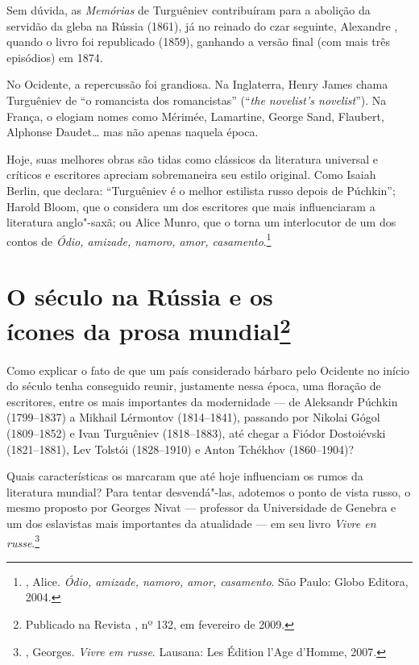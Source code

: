 Sem dúvida, as \emph{Memórias} de Turguêniev contribuíram para a abolição da servidão da gleba na Rússia (1861), já no reinado do czar seguinte, Alexandre , quando o livro foi republicado (1859), ganhando a versão final (com mais três episódios) em 1874.

No Ocidente, a repercussão foi grandiosa. Na Inglaterra, Henry James chama Turguêniev de ``o romancista dos romancistas'' (``\emph{the novelist's novelist}''). Na França, o elogiam nomes como Mérimée, Lamartine, George Sand, Flaubert, Alphonse Daudet\ldots{} mas não apenas naquela época.

Hoje, suas melhores obras são tidas como clássicos da literatura universal e críticos e escritores apreciam sobremaneira seu estilo original. Como Isaiah Berlin, que declara: ``Turguêniev é o melhor estilista russo depois de Púchkin''; Harold Bloom, que o considera um dos escritores que mais influenciaram a literatura anglo"-saxã; ou Alice Munro, que o torna um interlocutor de um dos contos de \emph{Ódio, amizade, namoro, amor, casamento}.\footnote{, Alice. \emph{Ódio, amizade, namoro, amor, casamento}. São Paulo: Globo Editora, 2004.}

\chapter{O século \protect{} na Rússia e os\\ ícones da prosa mundial\footnote{Publicado na Revista \protect{}, nº 132, em fevereiro de 2009.}}
\label{prosamundial}

Como explicar o fato de que um país considerado bárbaro pelo Ocidente no
início do século  tenha conseguido reunir, justamente nessa época,
uma floração de escritores, entre os mais importantes da modernidade ---
de Aleksandr Púchkin (1799--1837) a Mikhail Lérmontov (1814--1841),
passando por Nikolai Gógol (1809--1852) e Ivan Turguêniev (1818--1883),
até chegar a Fiódor Dostoiévski (1821--1881), Lev Tolstói (1828--1910) e
Anton Tchékhov (1860--1904)?

Quais características os marcaram que até hoje influenciam os rumos da literatura mundial? Para tentar desvendá"-las, adotemos o ponto de vista russo, o mesmo proposto por Georges Nivat --- professor da Universidade de Genebra e um dos eslavistas mais importantes da atualidade --- em seu livro \emph{Vivre en russe}.\footnote{, Georges. \emph{Vivre em russe}. Lausana: Les Édition l'Age d'Homme, 2007.}

